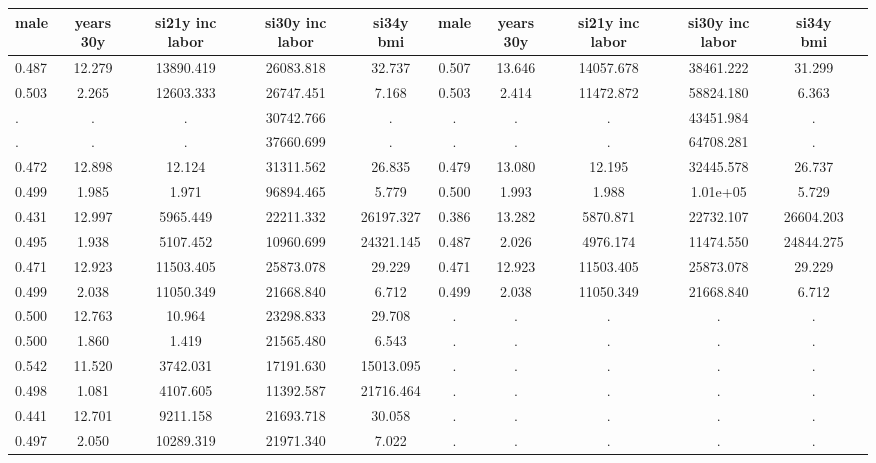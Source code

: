 \begin{table}[htbp]
\begin{tabular}{lcccccccccc} \hline \hline
 \multicolumn{1}{c}{ male }  & years 30y  & si21y inc labor  & si30y inc labor  & si34y bmi  & male  & years 30y  & si21y inc labor  & si30y inc labor  & si34y bmi  \\  \hline 
    0.487 &    12.279 & 13890.419 & 26083.818 &    32.737 &     0.507 &    13.646 & 14057.678 & 38461.222 &    31.299 \\  
    0.503 &     2.265 & 12603.333 & 26747.451 &     7.168 &     0.503 &     2.414 & 11472.872 & 58824.180 &     6.363 \\  
        . &         . &         . & 30742.766 &         . &         . &         . &         . & 43451.984 &         . \\  
        . &         . &         . & 37660.699 &         . &         . &         . &         . & 64708.281 &         . \\  
    0.472 &    12.898 &    12.124 & 31311.562 &    26.835 &     0.479 &    13.080 &    12.195 & 32445.578 &    26.737 \\  
    0.499 &     1.985 &     1.971 & 96894.465 &     5.779 &     0.500 &     1.993 &     1.988 &  1.01e+05 &     5.729 \\  
    0.431 &    12.997 &  5965.449 & 22211.332 & 26197.327 &     0.386 &    13.282 &  5870.871 & 22732.107 & 26604.203 \\  
    0.495 &     1.938 &  5107.452 & 10960.699 & 24321.145 &     0.487 &     2.026 &  4976.174 & 11474.550 & 24844.275 \\  
    0.471 &    12.923 & 11503.405 & 25873.078 &    29.229 &     0.471 &    12.923 & 11503.405 & 25873.078 &    29.229 \\  
    0.499 &     2.038 & 11050.349 & 21668.840 &     6.712 &     0.499 &     2.038 & 11050.349 & 21668.840 &     6.712 \\  
    0.500 &    12.763 &    10.964 & 23298.833 &    29.708 &         . &         . &         . &         . &         . \\  
    0.500 &     1.860 &     1.419 & 21565.480 &     6.543 &         . &         . &         . &         . &         . \\  
    0.542 &    11.520 &  3742.031 & 17191.630 & 15013.095 &         . &         . &         . &         . &         . \\  
    0.498 &     1.081 &  4107.605 & 11392.587 & 21716.464 &         . &         . &         . &         . &         . \\  
    0.441 &    12.701 &  9211.158 & 21693.718 &    30.058 &         . &         . &         . &         . &         . \\  
    0.497 &     2.050 & 10289.319 & 21971.340 &     7.022 &         . &         . &         . &         . &         . \\  
\hline \hline \end{tabular}
\end{table}
